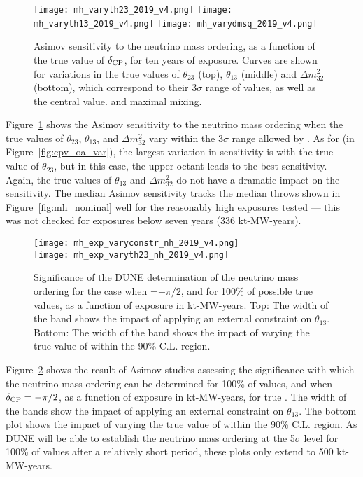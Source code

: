 \begin{figure}[htbp]
    \centering
    \texttt{[image: mh\_varyth23\_2019\_v4.png]}
    \texttt{[image: mh\_varyth13\_2019\_v4.png]}
    \texttt{[image: mh\_varydmsq\_2019\_v4.png]}
    \caption{Asimov sensitivity to the neutrino mass ordering, as a function of the true value of $\delta_{\rm CP}$, for ten years of exposure. Curves are shown for variations in the true values of $\theta_{23}$ (top), $\theta_{13}$ (middle) and $\Delta m^2_{32}$ (bottom), which correspond to their 3$\sigma$  range of values, as well as the  central value. and maximal mixing.}
    \label{fig:mh_oa_var}
\end{figure}
Figure~\ref{fig:mh_oa_var} shows the  Asimov sensitivity to the neutrino mass ordering when the true values of $\theta_{23}$, $\theta_{13}$, and $\Delta m^{2}_{32}$ vary within the 3$\sigma$ range allowed by . As for  (in Figure~\ref{fig:cpv_oa_var}), the largest variation in sensitivity is with the true value of $\theta_{23}$, but in this case, the upper octant leads to the best sensitivity. Again, the true values of $\theta_{13}$ and $\Delta m^2_{32}$ do not have a dramatic impact on the sensitivity. The median Asimov sensitivity tracks the median throws shown in Figure~\ref{fig:mh_nominal} well for the reasonably high exposures tested --- this was not checked for exposures below seven years (336 kt-MW-years).

\begin{figure}[htbp]
    \centering
    \texttt{[image: mh\_exp\_varyconstr\_nh\_2019\_v4.png]}\\
    \texttt{[image: mh\_exp\_varyth23\_nh\_2019\_v4.png]} 
    \caption[Significance of the DUNE neutrino mass ordering determination as a function of exposure]{Significance of the DUNE determination of the neutrino mass ordering for the case when \deltacp=$-\pi/2$, and for 100\% of possible true \deltacp values, as a function of exposure in kt-MW-years. Top: The width of the band shows the impact of applying an external constraint on $\theta_{13}$. Bottom: The width of the band shows the impact of varying the true value of  within the  90\% C.L. region.}
    \label{fig:mh_exposure}
\end{figure}
Figure~\ref{fig:mh_exposure} shows the result of Asimov studies assessing the significance
with which the neutrino mass ordering can be determined for 100\% of \deltacp values, and when $\delta_{\rm CP}=-\pi/2$, as a function of exposure in kt-MW-years, for true . The width of the bands show the impact of applying an external constraint on $\theta_{13}$. The bottom plot shows the impact of varying the true value of  within the  90\% C.L. region. As DUNE will be able to establish the neutrino mass ordering at the 5$\sigma$ level for 100\% of \deltacp values after a relatively short period, these plots only extend to 500 kt-MW-years. 

